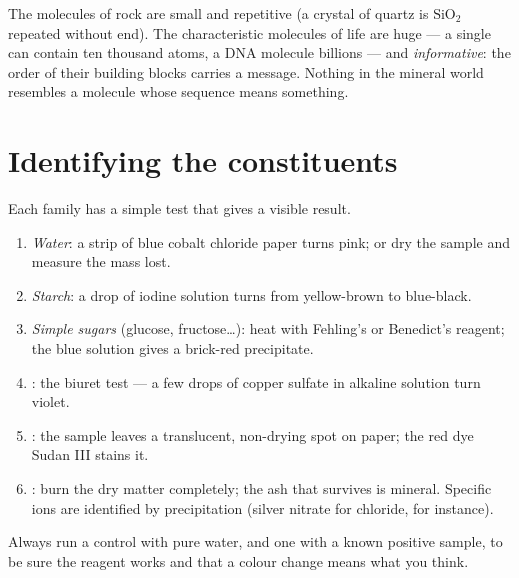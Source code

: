 \begin{remark}\label{rem:g10:chemistry-of-life:macromolecules}
The molecules of rock are small and repetitive (a crystal of quartz is
$\mathrm{SiO_2}$ repeated without end). The characteristic molecules of
life are huge --- a single  can contain ten thousand atoms, a
DNA molecule billions --- and \emph{informative}: the order of their
building blocks carries a message. Nothing in the mineral world
resembles a molecule whose sequence means something.
\end{remark}

\section{Identifying the constituents}

\begin{method}\label{met:g10:chemistry-of-life:tests}
Each family has a simple test that gives a visible result.
\begin{enumerate}
  \item \emph{Water}: a strip of blue cobalt chloride paper turns pink;
        or dry the sample and measure the mass lost.
  \item \emph{Starch}: a drop of iodine solution turns from
        yellow-brown to blue-black.
  \item \emph{Simple sugars} (glucose, fructose\dots): heat with
        Fehling's or Benedict's reagent; the blue solution gives a
        brick-red precipitate.
  \item \emph{}: the biuret test --- a few drops of copper
        sulfate in alkaline solution turn violet.
  \item \emph{}: the sample leaves a translucent, non-drying spot
        on paper; the red dye Sudan III stains it.
  \item \emph{}: burn the dry matter completely; the ash
        that survives is mineral. Specific ions are identified by
        precipitation (silver nitrate for chloride, for instance).
\end{enumerate}
Always run a control with pure water, and one with a known positive
sample, to be sure the reagent works and that a colour change means
what you think.
\end{method}

